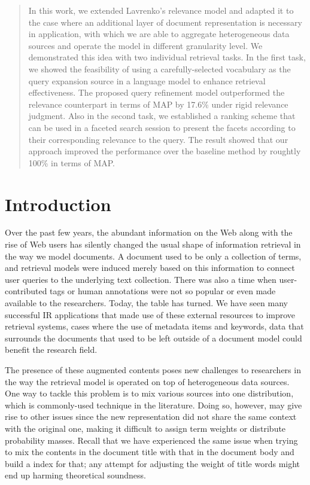 \begin{abstract} In this work, we extended Lavrenko's relevance model and
adapted it to the case where an additional layer of document representation is
necessary in application, with which we are able to aggregate heterogeneous
data sources and operate the model in different granularity level.  We
demonstrated this idea with two individual retrieval tasks.  In the first task,
we showed the feasibility of using a carefully-selected vocabulary as the query
expansion source in a language model to enhance retrieval effectiveness.  The
proposed query refinement model outperformed the relevance counterpart in terms
of MAP by 17.6\% under rigid relevance judgment.  Also in the second task, we
established a ranking scheme that can be used in a faceted search session to
present the facets according to their corresponding relevance to the query.
The result showed that our approach improved the performance over the baseline
method by roughtly 100\% in terms of MAP.  \end{abstract}

\section{Introduction}

Over the past few years, the abundant information on the Web along with the
rise of Web users has silently changed the usual shape of information retrieval
in the way we model documents.  A document used to be only a collection of
terms, and retrieval models were induced merely based on this information to
connect user queries to the underlying text collection.  There was also a time
when user-contributed tags or human annotations were not so popular or even
made available to the researchers.  Today, the table has turned.  We have seen
many successful IR applications that made use of these external resources to
improve retrieval systems, cases where the use of metadata items and keywords,
data that surrounds the documents that used to be left outside of a document
model could benefit the research field.  

The presence of these augmented contents poses new challenges to researchers in
the way the retrieval model is operated on top of heterogeneous data sources.
One way to tackle this problem is to mix various sources into one distribution,
which is commonly-used technique in the literature.  Doing so, however, may
give rise to other issues since the new representation did not share the same
context with the original one, making it difficult to assign term weights or
distribute probability masses.  Recall that we have experienced the same issue
when trying to mix the contents in the document title with that in the document
body and build a index for that; any attempt for adjusting the weight of title
words might end up harming theoretical soundness.

